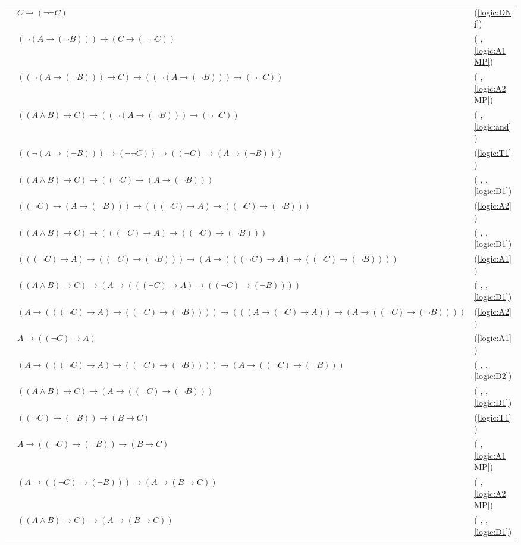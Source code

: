 \documentclass{article}
\newcommand{\sd}[1]{{\left(#1\right)}}
\newcommand{\rom}[1]{\romannumeral #1 \relax}
\newcommand{\pftab}[1]{
	\begin{tabular}{ >{\raggedright\arraybackslash}p{0.15\textwidth}<{}  >{\centering\arraybackslash}p{0.7\textwidth} >{\raggedleft\arraybackslash(}p{0.15\textwidth}<{)}}
		#1
	\end{tabular}\\
}
\begin{document}
\pftab{
	\rom{1}&$C \to \sd{\lnot\lnot C}$&\ref{logic:DNi}\\
	\rom{2}&$\sd{\lnot \sd{A \to \sd{\lnot B}}} \to \sd{C \to \sd{\lnot\lnot C}}$&\rom{1}, \ref{logic:A1MP}\\
	\rom{3}&$\sd{\sd{\lnot \sd{A \to \sd{\lnot B}}} \to C} \to \sd{\sd{\lnot \sd{A \to \sd{\lnot B}}} \to \sd{\lnot\lnot C}}$&\rom{2}, \ref{logic:A2MP}\\
	\rom{4}&$\sd{\sd{A \land B} \to C} \to \sd{\sd{\lnot \sd{A \to \sd{\lnot B}}} \to \sd{\lnot\lnot C}}$&\rom{3}, \ref{logic:and}\\
	\rom{5}&$\sd{\sd{\lnot \sd{A \to \sd{\lnot B}}} \to \sd{\lnot\lnot C}} \to \sd{\sd{\lnot C} \to \sd{A \to \sd{\lnot B}}}$&\ref{logic:T1}\\
	\rom{6}&$\sd{\sd{A \land B} \to C} \to \sd{\sd{\lnot C} \to \sd{A \to \sd{\lnot B}}}$&\rom{4}, \rom{5}, \ref{logic:D1}\\
	\rom{7}&$\sd{\sd{\lnot C} \to \sd{A \to \sd{\lnot B}}} \to \sd{\sd{\sd{\lnot C} \to A} \to \sd{\sd{\lnot C} \to \sd{\lnot B}}}$&\ref{logic:A2}\\
	\rom{8}&$\sd{\sd{A \land B} \to C} \to \sd{\sd{\sd{\lnot C} \to A} \to \sd{\sd{\lnot C} \to \sd{\lnot B}}}$&\rom{6}, \rom{7}, \ref{logic:D1}\\
	\rom{9}&$\sd{\sd{\sd{\lnot C} \to A} \to \sd{\sd{\lnot C} \to \sd{\lnot B}}} \to \sd{ A \to \sd{\sd{\sd{\lnot C} \to A} \to \sd{\sd{\lnot C} \to \sd{\lnot B}}}}$&\ref{logic:A1}\\
	\rom{10}&$\sd{\sd{A \land B} \to C} \to \sd{ A \to \sd{\sd{\sd{\lnot C} \to A} \to \sd{\sd{\lnot C} \to \sd{\lnot B}}}}$&\rom{8}, \rom{9}, \ref{logic:D1}\\
	\rom{11}&$\sd{ A \to \sd{\sd{\sd{\lnot C} \to A} \to \sd{\sd{\lnot C} \to \sd{\lnot B}}}} \to \sd{\sd{\sd{A \to \sd{\lnot C} \to A}} \to \sd{A \to \sd{\sd{\lnot C} \to \sd{\lnot B}}}}$&\ref{logic:A2}\\
	\rom{12}&$A \to \sd{\sd{\lnot C} \to A}$&\ref{logic:A1}\\
	\rom{13}&$\sd{ A \to \sd{\sd{\sd{\lnot C} \to A} \to \sd{\sd{\lnot C} \to \sd{\lnot B}}}} \to \sd{A \to \sd{\sd{\lnot C} \to \sd{\lnot B}}}$&\rom{11}, \rom{12}, \ref{logic:D2}\\
	\rom{14}&$\sd{\sd{A \land B} \to C} \to \sd{A \to \sd{\sd{\lnot C} \to \sd{\lnot B}}}$&\rom{10}, \rom{13}, \ref{logic:D1}\\
	\rom{15}&$\sd{\sd{\lnot C} \to \sd{\lnot B}} \to \sd{B \to C}$&\ref{logic:T1}\\
	\rom{16}&$A \to \sd{\sd{\lnot C} \to \sd{\lnot B}} \to \sd{B \to C}$&\rom{15}, \ref{logic:A1MP}\\
	\rom{17}&$\sd{A \to \sd{\sd{\lnot C} \to \sd{\lnot B}}} \to \sd{A \to \sd{B \to C}}$&\rom{16}, \ref{logic:A2MP}\\
	\rom{18}&$\sd{\sd{A \land B} \to C} \to \sd{A \to \sd{B \to C}}$&\rom{14}, \rom{17}, \ref{logic:D1}\\
}
\end{document}
